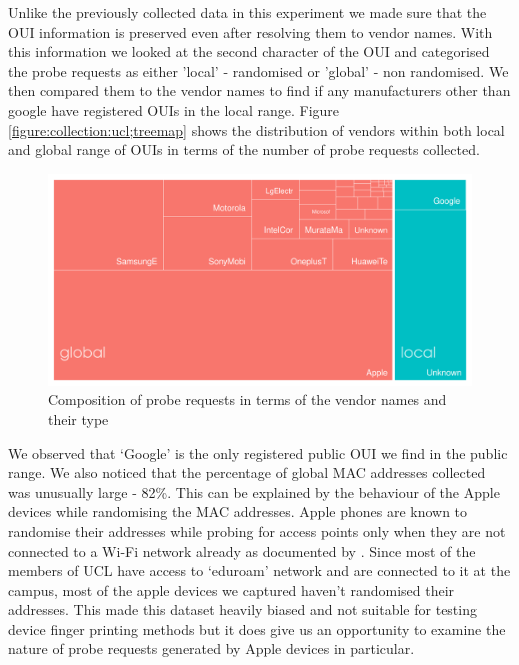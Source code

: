 Unlike the previously collected data in this experiment we made sure that the OUI information is preserved even after resolving them to vendor names.
With this information we looked at the second character of the OUI and categorised the probe requests as either 'local' - randomised or 'global' - non randomised.
We then compared them to the vendor names to find if any manufacturers other than google have registered OUIs in the local range.
Figure \ref{figure:collection:ucl;treemap} shows the distribution of vendors within both local and global range of OUIs in terms of the number of probe requests collected.

\begin{figure}
  \includegraphics{images/ucl-local-treemap.png}
  \caption{Composition of probe requests in terms of the vendor names and their type}
  \label{figure:collection:ucl:treemap}
\end{figure}

We observed that `Google' is the only registered public OUI we find in the public range. 
We also noticed that the percentage of global MAC addresses collected was unusually large - 82\%.
This can be explained by the behaviour of the Apple devices while randomising the MAC addresses. 
Apple phones are known to randomise their addresses while probing for access points only when they are not connected to a Wi-Fi network already as documented by \citet{vanhoef2016}.
Since most of the members of UCL have access to `eduroam' network and are connected to it at the campus, most of the apple devices we captured haven't randomised their addresses.
This made this dataset heavily biased and not suitable for testing device finger printing methods but it does give us an opportunity to examine the nature of probe requests generated by Apple devices in particular.

